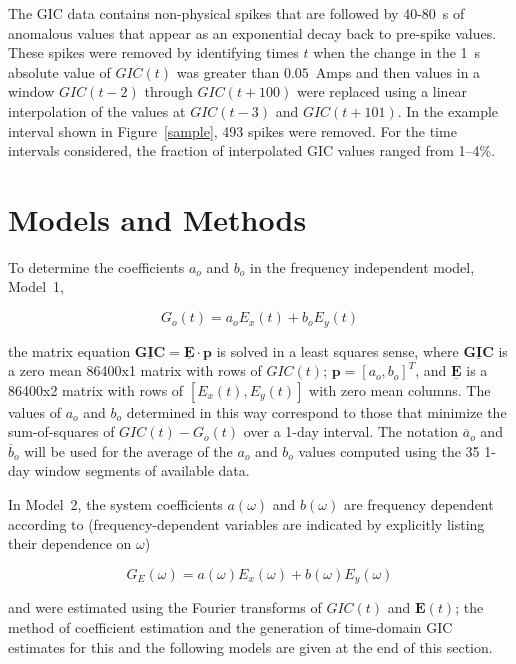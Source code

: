 \documentclass[draft,linenumbers]{agujournal2018}
\begin{document}
The GIC data contains non-physical spikes that are followed by 40-80~s of anomalous values that appear as an exponential decay back to pre-spike values. These spikes were removed by identifying times $t$ when the change in the 1~s absolute value of $GIC(t)$ was greater than $0.05$~Amps and then values in a window $GIC(t-2)$ through $GIC(t+100)$ were replaced using a linear interpolation of the values at $GIC(t-3)$ and $GIC(t + 101)$. In the example interval shown in Figure~\ref{sample}, 493 spikes were removed. For the time intervals considered, the fraction of interpolated GIC values ranged from 1--4\%.

\section{Models and Methods}
\label{section:Models_and_Methods}

To determine the coefficients $a_o$ and $b_o$ in the frequency independent model, Model~1,

\begin{linenomath*}
  \begin{equation}
    G_o(t) = a_oE_x(t) + b_oE_y(t)
    \label{model1}
  \end{equation}
\end{linenomath*}

\noindent
the matrix equation $\underline{\mathbf{GIC}} = \underline{\mathbf{E}}\cdot\mathbf{p}$ is solved in a least squares sense, where $\underline{\mathbf{GIC}}$ is a zero mean 86400x1 matrix with rows of $GIC(t)$; $\mathbf{p} = [a_o,b_o]^T$, and $\underline{\mathbf{E}}$ is a 86400x2 matrix with rows of $[E_x(t), E_y(t)]$ with zero mean columns. The values of $a_o$ and $b_o$ determined in this way correspond to those that minimize the sum-of-squares of $GIC(t)-G_o(t)$ over a 1-day interval. \citep[][provided the mathematically equivalent closed-form equations for solving the matrix equation.]{Pulkkinen2007} The notation $\overline{a}_o$ and $\overline{b}_o$ will be used for the average of the $a_o$ and $b_o$ values computed using the 35 1-day window segments of available data.

In Model~2, the system coefficients $a(\omega)$ and $b(\omega)$ are frequency dependent according to (frequency-dependent variables are indicated by explicitly listing their dependence on $\omega$)

\begin{linenomath*}
  \begin{equation}
    G_E(\omega) = a(\omega)E_x(\omega) + b(\omega)E_y(\omega)
    \label{model2}
  \end{equation}
\end{linenomath*}
\noindent
and were estimated using the Fourier transforms of  $GIC(t)$ and $\mathbf{E}(t)$; the method of coefficient estimation and the generation of time-domain GIC estimates for this and the following models are given at the end of this section.
\end{document}
